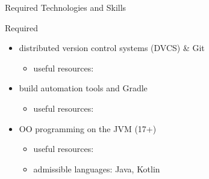 \documentclass[presentation]{beamer}\mode<presentation>{\usetheme{AMSBolognaFC}}
\begin{document}
\begin{frame}[c,allowframebreaks]{Required Technologies and Skills}



\begin{alertblock}{Required}
	\begin{itemize}
		\item[$\checkmark$] distributed version control systems (DVCS) \& \alert{Git}
		\begin{itemize}
			\item useful resources: 
		\end{itemize}

		\vfill

		\item[$\checkmark$] build automation tools and \alert{Gradle}
		\begin{itemize}
			\item useful resources: 
		\end{itemize}

		\vfill

		\item[$\checkmark$] OO programming on the JVM (17+)
		\begin{itemize}
			\item useful resources:  %
			\item admissible languages: Java, \alert{Kotlin}
		\end{itemize}

		\vfill



\end{itemize}
\end{alertblock}
\end{frame}
\end{document}
